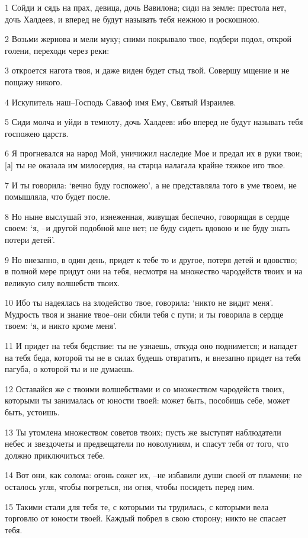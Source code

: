 \par 1 Сойди и сядь на прах, девица, дочь Вавилона; сиди на земле: престола нет, дочь Халдеев, и вперед не будут называть тебя нежною и роскошною.
\par 2 Возьми жернова и мели муку; сними покрывало твое, подбери подол, открой голени, переходи через реки:
\par 3 откроется нагота твоя, и даже виден будет стыд твой. Совершу мщение и не пощажу никого.
\par 4 Искупитель наш--Господь Саваоф имя Ему, Святый Израилев.
\par 5 Сиди молча и уйди в темноту, дочь Халдеев: ибо вперед не будут называть тебя госпожею царств.
\par 6 Я прогневался на народ Мой, уничижил наследие Мое и предал их в руки твои; [а] ты не оказала им милосердия, на старца налагала крайне тяжкое иго твое.
\par 7 И ты говорила: `вечно буду госпожею', а не представляла того в уме твоем, не помышляла, что будет после.
\par 8 Но ныне выслушай это, изнеженная, живущая беспечно, говорящая в сердце своем: `я, --и другой подобной мне нет; не буду сидеть вдовою и не буду знать потери детей'.
\par 9 Но внезапно, в один день, придет к тебе то и другое, потеря детей и вдовство; в полной мере придут они на тебя, несмотря на множество чародейств твоих и на великую силу волшебств твоих.
\par 10 Ибо ты надеялась на злодейство твое, говорила: `никто не видит меня'. Мудрость твоя и знание твое--они сбили тебя с пути; и ты говорила в сердце твоем: `я, и никто кроме меня'.
\par 11 И придет на тебя бедствие: ты не узнаешь, откуда оно поднимется; и нападет на тебя беда, которой ты не в силах будешь отвратить, и внезапно придет на тебя пагуба, о которой ты и не думаешь.
\par 12 Оставайся же с твоими волшебствами и со множеством чародейств твоих, которыми ты занималась от юности твоей: может быть, пособишь себе, может быть, устоишь.
\par 13 Ты утомлена множеством советов твоих; пусть же выступят наблюдатели небес и звездочеты и предвещатели по новолуниям, и спасут тебя от того, что должно приключиться тебе.
\par 14 Вот они, как солома: огонь сожег их, --не избавили души своей от пламени; не осталось угля, чтобы погреться, ни огня, чтобы посидеть перед ним.
\par 15 Такими стали для тебя те, с которыми ты трудилась, с которыми вела торговлю от юности твоей. Каждый побрел в свою сторону; никто не спасает тебя.

